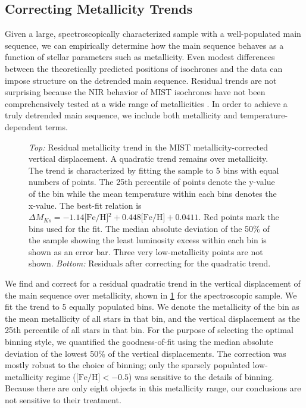 \documentclass[twocolumn]{aastex6}
\newcommand{\MK}{\ensuremath{M_{Ks}}}
\newcommand{\feh}{\textrm{[Fe/H]}}
\begin{document}
\subsection{Correcting Metallicity Trends}
\label{sec:speccor}

Given a large, spectroscopically characterized sample with a well-populated 
main sequence, we can empirically determine how the main sequence behaves as a
function of stellar parameters such as metallicity.  Even modest differences 
between the theoretically predicted positions of isochrones and the data can 
impose structure on the detrended main sequence. Residual trends are not 
surprising because the NIR behavior of MIST isochrones have not been 
comprehensively tested at a wide range of metallicities \citep{Choi16}.  In 
order to achieve a truly detrended main sequence, we include both metallicity 
and temperature-dependent terms.

\begin{figure}[htb]
    \centering
    \caption{\emph{Top:} Residual metallicity trend in the MIST 
        metallicity-corrected vertical displacement. A quadratic trend remains over 
        metallicity. The trend is characterized by fitting the sample to 
        5 bins with equal numbers of points.  The 25th percentile of points 
        denote the y-value of the bin while the mean temperature within each
        bins denotes the x-value. The best-fit relation is \(\Delta
            \MK{} = -1.14\feh{}^2 + 0.448 \feh{} + 0.0411\). Red points mark 
            the bins used for the fit.  The median absolute deviation of the 
            50\% of the sample showing the
        least luminosity excess within each bin is shown as an error bar. Three 
        very low-metallicity points are not shown.  \emph{Bottom:} Residuals 
        after correcting for the quadratic trend.}\label{fig:met_trend}
\end{figure}

We find and correct for a residual quadratic trend in the vertical 
displacement of the main sequence over metallicity, shown in 
\cref{fig:met_trend} for the spectroscopic sample.  We fit the trend to 5 
equally populated bins. We denote 
the metallicity of the bin as the mean metallicity of all stars in that bin, 
and the vertical displacement as the 25th percentile of all stars in that bin. 
For the purpose of selecting the optimal binning style, we quantified the 
goodness-of-fit using the median absolute deviation of the lowest
50\% of the vertical displacements. The correction was mostly robust to the choice 
of binning; only the sparsely populated low-metallicity regime 
(\(\feh{} < -0.5\)) was sensitive to the details of binning. Because there are 
only eight objects in this metallicity range, our conclusions are not 
sensitive to their treatment.
\end{document}
